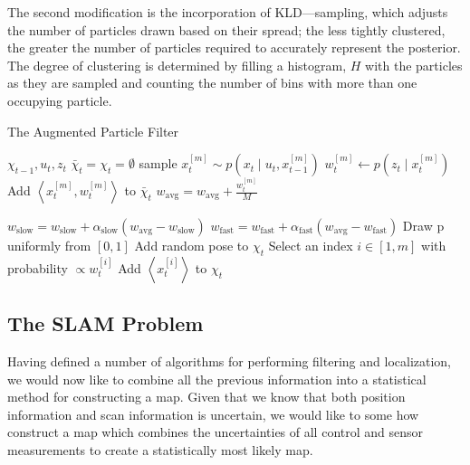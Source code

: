 \documentclass[english]{article}
\begin{document}
The second modification is the incorporation of KLD---sampling, which adjusts the number of particles drawn based on their spread; the less tightly clustered, the greater the number of particles required to accurately represent the posterior. The degree of clustering is determined by filling a histogram, $H$ with the particles as they are sampled and counting the number of bins with more than one occupying particle.


\begin{algorithm}
\caption{The Augmented Particle Filter}
\label{alg:augmented_particle}
\begin{algorithmic}
	\REQUIRE $\chi_{t-1}, u_t, z_t$
        \STATE $\bar{\chi}_t = \chi_t = \emptyset$
        \STATE sample $x^{[m]}_t \sim p(x_t \mid u_t,x^{[m]}_{t-1})$
        \STATE $w^{[m]}_t \leftarrow p(z_t \mid x^{[m]}_t)$
        \STATE Add $\left\langle x^{[m]}_t, w^{[m]}_t \right\rangle$ to $\bar{\chi}_t$
        \STATE $w_{\mathrm{avg}} = w_{\mathrm{avg}} + \frac{w^{[m]}_t}{M}$
        \ENDFOR

        \STATE $w_{\mathrm{slow}} = w_{\mathrm{slow}} + \alpha_{\mathrm{slow}} (w_{\mathrm{avg}} - w_{\mathrm{slow}})$
        \STATE $w_{\mathrm{fast}} = w_{\mathrm{fast}} + \alpha_{\mathrm{fast}} (w_{\mathrm{avg}} - w_{\mathrm{fast}})$
        \STATE Draw p uniformly from $[0,1]$
          \STATE Add random pose to $\chi_t$
          \ELSE
          \STATE Select an index $i \in [1,m]$ with probability $\propto w^{[i]}_t$
          \STATE Add $\left\langle x^{[i]}_t \right\rangle$ to $\chi_t$
        \ENDIF

        \ENDFOR

\end{algorithmic}
\end{algorithm}

\subsection{The SLAM Problem}
Having defined a number of algorithms for performing filtering and localization, we would now like to combine all the previous information into a statistical method for constructing a map. Given that we know that both position information and scan information is uncertain, we would like to some how construct a map which combines the uncertainties of all control and sensor measurements to create a statistically most likely map.
\end{document}
